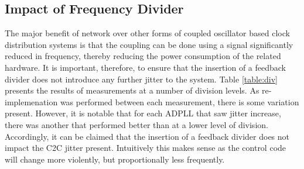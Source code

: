 \subsection{Impact of Frequency Divider}
The major benefit of  network over other forms of coupled oscillator based clock distribution systems is that the coupling can be done using a signal significantly reduced in frequency, thereby reducing the power consumption of the related hardware. It is important, therefore, to ensure that the insertion of a feedback divider does not introduce any further jitter to the system. Table \ref{table:div} presents the results of measurements at a number of division levels. As re-implemenation was performed between each measurement, there is some variation present. However, it is notable that for each \ac{ADPLL} that saw  jitter increase, there was another that performed better than at a lower level of division. Accordingly, it can be claimed that the insertion of a feedback divider does not impact the \ac{C2C} jitter present. Intuitively this makes sense as the control code will change more violently, but proportionally less frequently. 
